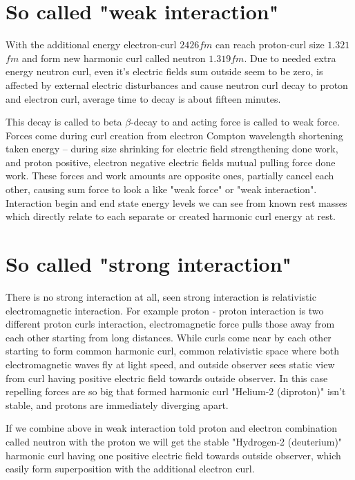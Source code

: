 \section{So called "weak interaction"}
\label{weak_interaction}

With the additional energy electron-curl
$2426$\allowbreak$fm$\allowbreak\cite{ComptonWavelength} can reach
pro\-ton-curl size $1.321$\allowbreak$fm$ and form new harmonic curl called
neutron $1.319$\allowbreak$fm$. Due to needed extra energy neutron curl, even
it's electric fields sum outside seem to be zero, is affected by external
electric disturbances and cause neutron curl decay to proton and electron
curl, average time to decay is about fifteen minutes.

This decay is called to beta $\beta$-decay to and acting force is called to
weak force. Forces come during curl creation from electron Compton wavelength
shortening taken energy -- during size shrinking for electric field
strengthening done work, and proton positive, electron negative electric
fields mutual pulling force done work. These forces and work amounts are
opposite ones, partially cancel each other, causing sum force to look a like
"weak force" or "weak interaction". Interaction begin and end state energy
levels we can see from known rest masses which directly relate to each
separate or created harmonic curl energy at rest.

\section{So called "strong interaction"}
\label{strong_interaction}

There is no strong interaction at all, seen strong interaction is
relativistic electromagnetic interaction. For example proton - proton
interaction is two different proton curls interaction, electromagnetic force
pulls those away from each other starting from long distances. While curls
come near by each other starting to form common harmonic curl, common
relativistic space where both electromagnetic waves fly at light speed, and
outside observer sees static view from curl having positive electric field
towards outside observer. In this case repelling forces are so big that
formed harmonic curl "Helium-2 (diproton)" isn't stable, and protons are
immediately diverging apart.

If we combine above in weak interaction told proton and electron combination
called neutron with the proton we will get the stable "Hydrogen-2
(deuterium)" harmonic curl having one positive electric field towards outside
observer, which easily form superposition with the additional electron curl.

